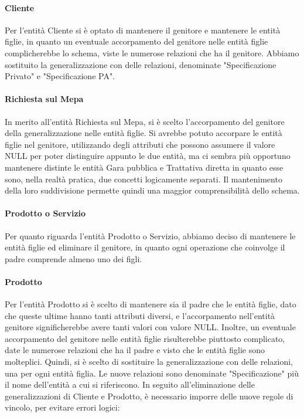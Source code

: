 \paragraph{Cliente}
Per l'entità Cliente si è optato di mantenere il genitore e mantenere le entità figlie, in quanto un eventuale accorpamento del genitore nelle entità figlie complicherebbe lo schema, viste le numerose relazioni che ha il genitore. Abbiamo sostituito la generalizzazione con delle relazioni, denominate "Specificazione Privato" e "Specificazione PA".
\paragraph{Richiesta sul Mepa}
In merito all'entità Richiesta sul Mepa, si è scelto l'accorpamento del genitore della generalizzazione nelle entità figlie. Si avrebbe potuto accorpare le entità figlie nel genitore, utilizzando degli attributi che possono assumere il valore NULL per poter distinguire appunto le due entità, ma ci sembra più opportuno mantenere distinte le entità Gara pubblica e Trattativa diretta in quanto esse sono, nella realtà pratica, due concetti logicamente separati. Il mantenimento della loro suddivisione permette quindi una maggior comprensibilità dello schema.
\paragraph{Prodotto o Servizio}
Per quanto riguarda l'entità Prodotto o Servizio, abbiamo deciso di mantenere le entità figlie ed eliminare il genitore, in quanto ogni operazione che coinvolge il padre comprende almeno uno dei figli.
\paragraph{Prodotto}
Per l'entità Prodotto si è scelto di mantenere sia il padre che le entità figlie, dato che queste ultime hanno tanti attributi diversi, e l'accorpamento nell'entità genitore significherebbe avere tanti valori con valore NULL. Inoltre, un eventuale accorpamento del genitore nelle entità figlie risulterebbe piuttosto complicato, date le numerose relazioni che ha il padre e visto che le entità figlie sono molteplici.
Quindi, si è scelto di sostituire la generalizzazione con delle relazioni, una per ogni entità figlia. Le nuove relazioni sono denominate "Specificazione" più il nome dell'entità a cui si riferiscono.
\newline\newline
In seguito all'eliminazione delle generalizzazioni di Cliente e Prodotto, è necessario imporre delle nuove regole di vincolo, per evitare errori logici:

